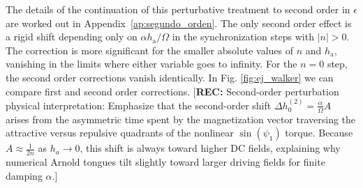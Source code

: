 \documentclass[prb,aps,twocolumn,superscriptaddress,floatfix]{revtex4-1}
\newcommand{\aleadd}[1]{{\color{blue}#1}}
\newcommand{\rec}[1]{{\color{magenta}[\textbf{REC:} #1]}}
\begin{document}
The details of the continuation of this perturbative treatment to second order in $\epsilon$ are worked out in Appendix~\ref{ap:segundo_orden}. The only second order effect is a rigid shift depending only on $\alpha h_\text{a}/\Omega$ in the synchronization steps with $|n|>0$. The correction is more significant for the smaller absolute values of $n$ and $h_\text{a}$, vanishing in the limits where either variable goes to infinity. For the $n=0$ step, the second order corrections vanish identically. \aleadd{In Fig. \ref{fig:ej_walker} we can compare first and second order corrections.}
\rec{Second-order perturbation physical interpretation: Emphasize that the second-order shift $\Delta h_0^{(2)} = \frac{\alpha}{\Omega}A$ arises from the asymmetric time spent by the magnetization vector traversing the attractive versus repulsive quadrants of the nonlinear $\sin(\psi_1)$ torque. Because $A \approx \frac{1}{2n}$ as $h_a \to 0$, this shift is always toward higher DC fields, explaining why numerical Arnold tongues tilt slightly toward larger driving fields for finite damping $\alpha$.}
\end{document}
